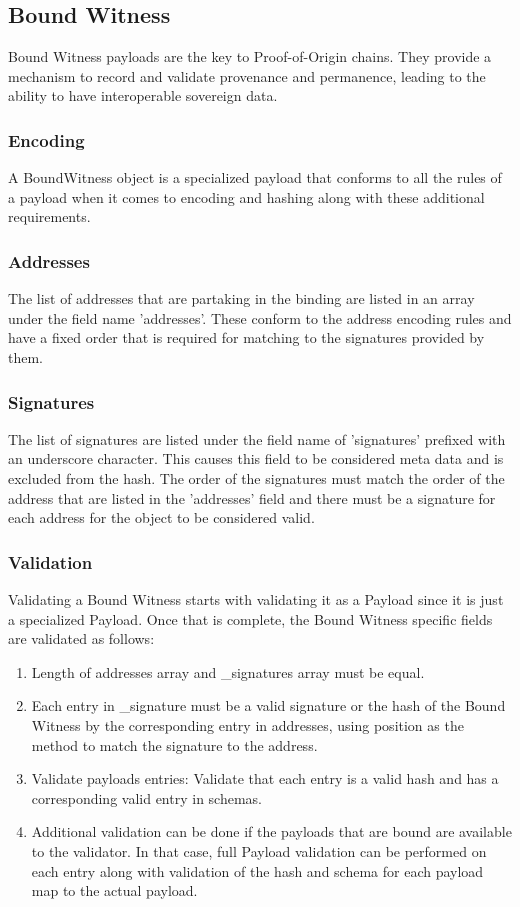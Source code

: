 \documentclass{article}
\begin{document}
\subsection{Bound Witness}
Bound Witness payloads are the key to Proof-of-Origin chains.  They provide a mechanism to record and validate provenance and permanence, leading to the ability to have interoperable sovereign data.
\subsubsection{Encoding}
A BoundWitness object is a specialized payload that conforms to all the rules of a payload when it comes to encoding and hashing along with these additional requirements.

\subsubsection{Addresses}
The list of addresses that are partaking in the binding are listed in an array under the field name 'addresses'.  These conform to the address encoding rules and have a fixed order that is required for matching to the signatures provided by them.

\subsubsection{Signatures}
The list of signatures are listed under the field name of 'signatures' prefixed with an underscore character.  This causes this field to be considered meta data and is excluded from the hash.  The order of the signatures must match the order of the address that are listed in the 'addresses' field and there must be a signature for each address for the object to be considered valid.

\subsubsection{Validation}
Validating a Bound Witness starts with validating it as a Payload since it is just a specialized Payload.  Once that is complete, the Bound Witness specific fields are validated as follows:

\begin{enumerate}
    \item Length of addresses array and \_signatures array must be equal.
    \item Each entry in \_signature must be a valid signature or the hash of the Bound Witness by the corresponding entry in addresses, using position as the method to match the signature to the address.
    \item Validate payloads entries: Validate that each entry is a valid hash and has a corresponding valid entry in schemas.
    \item Additional validation can be done if the payloads that are bound are available to the validator.  In that case, full Payload validation can be performed on each entry along with validation of the hash and schema for each payload map to the actual payload.
\end{enumerate}
\end{document}

